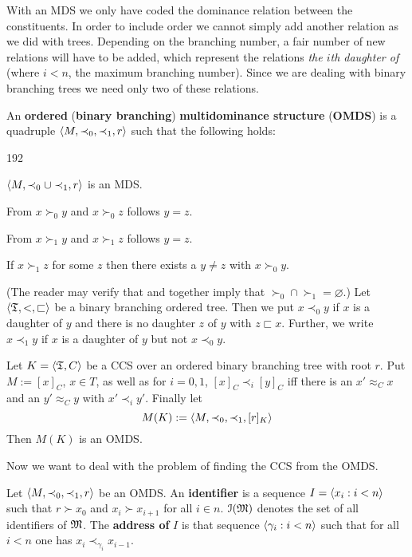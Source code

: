 With an MDS we only have coded the dominance relation between the
constituents. In order to include order we cannot simply add
another relation as we did with trees. Depending on the branching
number, a fair number of new relations will have to be added,
which represent the relations {\it the $i$th daughter of} (where
$i < n$, the maximum branching number). Since we are dealing with
binary branching trees we need only two of these relations.
\begin{defn}
An \textbf{ordered} (\textbf{binary branching}) 
\textbf{multidominance structure} (\textbf{OMDS}) is a quadruple 
$\langle M, \prec_0, \prec_1, r\rangle$
such that the following holds:
\begin{dingautolist}{192}
\item $\langle M, \prec_0 \cup \prec_1, r\rangle$ is an MDS.
\item From $x \succ_0 y$ and $x \succ_0 z$ follows $y = z$.
\item From $x \succ_1 y$ and $x \succ_1 z$ follows $y = z$.
\item If $x \succ_1 z$ for some $z$ then there exists a
    $y \neq z$ with $x \succ_0 y$.
\end{dingautolist}
\end{defn}
(The reader may verify that  and  together imply 
that $\succ_0 \cap \succ_1 = \varnothing$.)
Let $\langle \mathfrak{T}, <, \sqsubset\rangle$ be a binary branching ordered tree.
Then we put $x \prec_0 y$ if $x$ is a daughter of $y$ and there is
no daughter $z$ of $y$ with $z \sqsubset x$. Further, we write
$x \prec_1 y$ if $x$ is a daughter of $y$ but not $x \prec_0 y$.
\begin{thm}
Let $K = \langle \mathfrak{T}, C\rangle$ be a CCS over an ordered binary branching
tree with root $r$. Put $M := [x]_C$, $x \in T$, as well as for 
$i = 0,1$, $[x]_C \prec_i [y]_C$ iff there is an 
$x' \approx_C x$ and an $y' \approx_C y$ with $x' \prec_i y'$. 
Finally let 
\begin{equation}
M(K) := \langle M, \prec_0, \prec_1, [r]_K\rangle
\end{equation}
Then $M(K)$ is an OMDS.
\end{thm}
Now we want to deal with the problem of finding the CCS from
the OMDS.
\begin{defn}
Let $\langle M, \prec_0, \prec_1, r\rangle$ be an OMDS. An
\textbf{identifier} is a sequence $I = \langle x_i : i < n\rangle$ such that
$r \succ x_0$ and $x_i \succ x_{i+1}$ for all $i \in n$.
$\mathcal{I}(\mathfrak{M})$ denotes the set of all identifiers of $\mathfrak{M}$.
The \textbf{address of} 
$I$ is that sequence $\langle \gamma_i : i < n\rangle$ such that for
all $i < n$ one has $x_{i} \prec_{\gamma_i} x_{i-1}$.
\end{defn}

